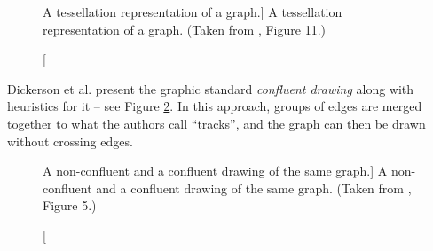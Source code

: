 \begin{figure}[htp]
	\centering
	\caption
	[A tessellation representation of a graph.]
	{A tessellation representation of a graph. (Taken from \cite{DiBattista1994}, Figure 11.)}
	\label{fig:images_graphs_tessellation}
\end{figure}

Dickerson et al. present the graphic standard \emph{confluent drawing} along
with heuristics for it \cite{Dickerson2005} -- see Figure
\ref{fig:images_graphs_confluent}. In this approach, groups of edges are
merged together to what the authors call ``tracks'', and the graph can then be
drawn without crossing edges.

\begin{figure}[htp]
	\centering
	\caption
	[A non-confluent and a confluent drawing of the same graph.]
	{A non-confluent and a confluent drawing of the same graph. 
	(Taken from \cite{Dickerson2005}, Figure 5.)}
	\label{fig:images_graphs_confluent}
\end{figure}

